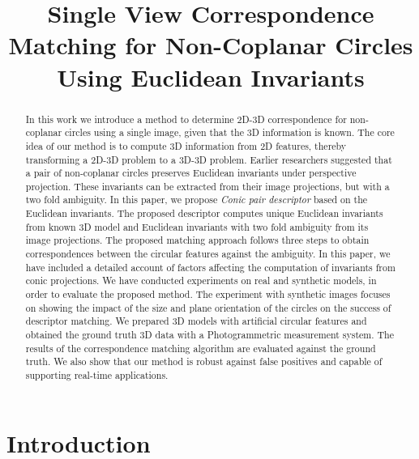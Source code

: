 \documentclass{bmvc2k}
\title{Single View Correspondence Matching for Non-Coplanar Circles Using Euclidean Invariants}
\newcommand{\yuji}[1]{\textcolor{magenta}{[Yuji: #1]}}
\begin{document}
\maketitle

\begin{abstract}
In this work we introduce a method to determine 2D-3D correspondence for non-coplanar circles using a single image, given that the 3D information is known. 
The core idea of our method is to compute 3D information from 2D features, thereby transforming a 2D-3D problem to a 3D-3D problem. 
Earlier researchers suggested that a pair of non-coplanar circles preserves Euclidean invariants under perspective projection.
These invariants can be extracted from their image projections, but with a two fold ambiguity. 
In this paper, we propose \textit{Conic pair descriptor} based on the Euclidean invariants.
The proposed descriptor computes unique Euclidean invariants from known 3D model and Euclidean invariants with two fold ambiguity from its image projections.
The proposed matching approach follows three steps to obtain correspondences between the circular features against the ambiguity.
In this paper, we have included a detailed account of factors affecting the computation of invariants from conic projections. 
We have conducted experiments on real and synthetic models, in order to evaluate the proposed method. 
The experiment with synthetic images focuses on showing the impact of the size and plane orientation of the circles on the success of descriptor matching. 
We prepared 3D models with artificial circular features and obtained the ground truth 3D data with a Photogrammetric measurement system. 
The results of the correspondence matching algorithm are evaluated against the ground truth. 
We also show that our method is robust against false positives and capable of supporting real-time applications.   

\end{abstract}

\section{Introduction}
\label{sec:intro}
\end{document}
